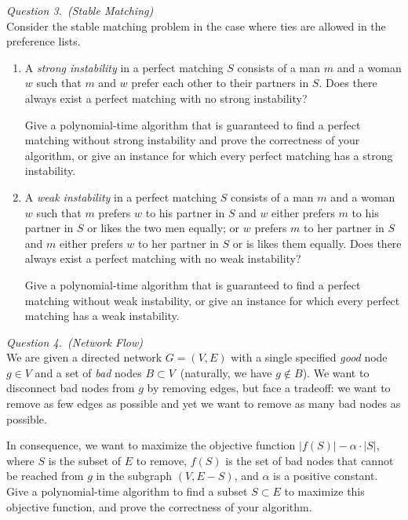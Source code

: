 \documentclass[11pt]{article}
\begin{document}
\bigskip\rm\noindent
\emph{Question 3.~(Stable Matching)}\\
Consider the stable matching problem in the case where ties are allowed in
the preference lists.
\begin{enumerate}
  \itemsep 0pt
  \item
    A \emph{strong instability} in a perfect matching $S$ consists of a man $m$
    and a woman $w$ such that $m$ and $w$ prefer each other to their partners
    in $S$.  Does there always exist a perfect matching with no strong
    instability?
    
    Give a polynomial-time algorithm that is guaranteed to find a
    perfect matching without strong instability and prove the correctness of
    your algorithm, or give an instance for which every perfect matching has a
    strong instability.
  \item
    A \emph{weak instability} in a perfect matching $S$ consists of a man $m$
    and a woman $w$ such that $m$ prefers $w$ to his partner in $S$ and $w$
    either prefers $m$ to his partner in $S$ or likes the two men equally; or
    $w$ prefers $m$ to her partner in $S$ and $m$ either prefers $w$ to her
    partner in $S$ or is likes them equally.  Does there always exist a
    perfect matching with no weak instability?
    
    Give a polynomial-time
    algorithm that is guaranteed to find a perfect matching without weak
    instability, or give an instance for which every perfect matching has a
    weak instability.
\end{enumerate}

\bigskip\rm\noindent
\emph{Question 4.~(Network Flow)}\\
We are given a directed network $G=(V,E)$ with a single specified \emph{good}
node $g\in V$ and a set of \emph{bad} nodes $B\subset V$~(naturally, we
have $g\not\in B$).  We want to disconnect bad nodes from $g$ by removing
edges, but face a tradeoff: we want to remove as few edges as possible and
yet we want to remove as many bad nodes as possible.

In consequence, we want to maximize the objective function $|f(S)| -
\alpha\cdot|S|$, where $S$ is the subset of $E$ to remove, $f(S)$ is the set of
bad nodes that cannot be reached from $g$ in the subgraph $(V, E-S)$, and
$\alpha$ is a positive constant.  Give a polynomial-time algorithm to find a
subset $S\subset E$ to maximize this objective function, and prove the
correctness of your algorithm.
\end{document}
